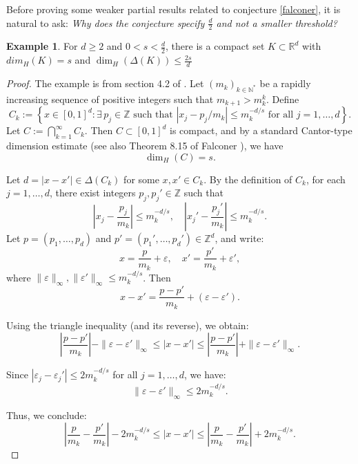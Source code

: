 \documentclass[12pt,a4paper]{report}
\theoremstyle{definition}
\newtheorem{example}{Example}
\begin{document}
Before proving some weaker partial results related to conjecture \ref{falconer}, it is natural to ask: \textit{Why does the conjecture specify $\frac{d}{2}$ and not a smaller threshold?}

\begin{example}
    For $d \geq 2$ and $0 < s < \frac{d}{2}$, there is a compact set $K \subset \mathbb{R}^d$ with $dim_H(K) = s$ and $\dim_H(\Delta(K)) \leq \frac{2s}{d}$
\end{example}

\begin{proof}
The example is from section 4.2 of \cite{mattila2015fourier}.
Let \( (m_k)_{k \in \mathbb{N}^*} \) be a rapidly increasing sequence of positive integers such that \( m_{k+1} > m_k^k \). Define
\[
C_k := \left\{ x \in [0,1]^d : \exists \, p_j \in \mathbb{Z} \text{ such that } |x_j - p_j/m_k| \leq m_k^{-d/s} \text{ for all } j = 1,\dots,d \right\}.
\]
Let \( C := \bigcap_{k=1}^\infty C_k \). Then \( C \subset [0,1]^d \) is compact, and by a standard Cantor-type dimension estimate (see also Theorem 8.15 of Falconer \cite{falconer1985geometry}), we have
\[
\dim_H(C) = s.
\]

Let \( d = |x - x'| \in \Delta(C_k) \) for some \( x, x' \in C_k \). By the definition of \( C_k \), for each \( j = 1, \dots, d \), there exist integers \( p_j, p_j' \in \mathbb{Z} \) such that
\[
\left| x_j - \frac{p_j}{m_k} \right| \le m_k^{-d/s}, \quad \left| x_j' - \frac{p_j'}{m_k} \right| \le m_k^{-d/s}.
\]
Let \( p = (p_1, \dots, p_d) \) and \( p' = (p_1', \dots, p_d') \in \mathbb{Z}^d \), and write:
\[
x = \frac{p}{m_k} + \varepsilon, \quad x' = \frac{p'}{m_k} + \varepsilon',
\]
where \( \| \varepsilon \|_\infty, \| \varepsilon' \|_\infty \le m_k^{-d/s} \). Then
\[
x - x' = \frac{p - p'}{m_k} + (\varepsilon - \varepsilon').
\]

Using the triangle inequality (and its reverse), we obtain:
\[
\left| \frac{p - p'}{m_k} \right| - \| \varepsilon - \varepsilon' \|_\infty
\le |x - x'|
\le \left| \frac{p - p'}{m_k} \right| + \| \varepsilon - \varepsilon' \|_\infty.
\]

Since \( |\varepsilon_j - \varepsilon_j'| \le 2 m_k^{-d/s} \) for all \( j = 1, \dots, d \), we have:
\[
\| \varepsilon - \varepsilon' \|_\infty \le 2 m_k^{-d/s}.
\]

Thus, we conclude:
\begin{equation}
\left| \frac{p}{m_k} - \frac{p'}{m_k} \right| - 2 m_k^{-d/s}
\le |x - x'|
\le \left| \frac{p}{m_k} - \frac{p'}{m_k} \right| + 2 m_k^{-d/s}.
\label{eq:distance_sandwich}
\end{equation}


\end{proof}
\end{document}

